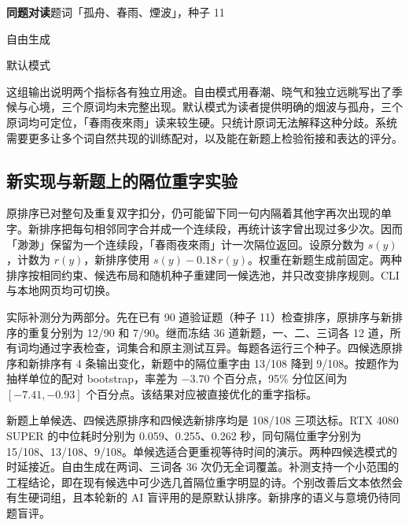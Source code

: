 \begin{poembox}
\small\noindent\textbf{同题对读}\quad 题词「{\versefont 孤舟、春雨、煙波}」，种子 11\par
\noindent 自由生成\par
\noindent 默认模式
\end{poembox}

这组输出说明两个指标各有独立用途。自由模式用春潮、晓气和独立远眺写出了季候与心境，三个原词均未完整出现。默认模式为读者提供明确的烟波与孤舟，三个原词均可定位，「春雨夜來雨」读来较生硬。只统计原词无法解释这种分歧。系统需要更多让多个词自然共现的训练配对，以及能在新题上检验衔接和表达的评分。

\subsection{新实现与新题上的隔位重字实验}

原排序已对整句及重复双字扣分，仍可能留下同一句内隔着其他字再次出现的单字。新排序把每句相邻同字合并成一个连续段，再统计该字曾出现过多少次。因而「渺渺」保留为一个连续段，「春雨夜來雨」计一次隔位返回。设原分数为 $s(y)$，计数为 $r(y)$，新排序使用 $s(y)-0.18\,r(y)$。权重在新题生成前固定。两种排序按相同约束、候选布局和随机种子重建同一候选池，并只改变排序规则。CLI 与本地网页均可切换。

实际补测分为两部分。先在已有 90 道验证题（种子 11）检查排序，原排序与新排序的重复分别为 12/90 和 7/90。继而冻结 36 道新题，一、二、三词各 12 道，所有词均通过字表检查，词集合和原主测试互异。每题各运行三个种子。四候选原排序和新排序有 4 条输出变化，新题中的隔位重字由 13/108 降到 9/108。按题作为抽样单位的配对 bootstrap，率差为 $-3.70$ 个百分点，95\% 分位区间为 $[-7.41,-0.93]$ 个百分点。该结果对应被直接优化的重字指标。


新题上单候选、四候选原排序和四候选新排序均是 108/108 三项达标。RTX 4080 SUPER 的中位耗时分别为 0.059、0.255、0.262 秒，同句隔位重字分别为 15/108、13/108、9/108。单候选适合更重视等待时间的演示。两种四候选模式的时延接近。自由生成在两词、三词各 36 次仍无全词覆盖。补测支持一个小范围的工程结论，即在现有候选中可少选几首隔位重字明显的诗。个别改善后文本依然会有生硬词组，且本轮新的 AI 盲评用的是原默认排序。新排序的语义与意境仍待同题盲评。
